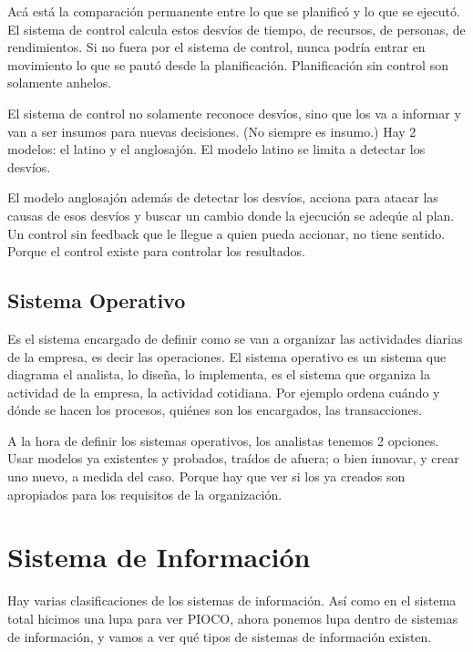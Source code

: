 Acá está la comparación permanente entre lo que se planificó y lo que se
ejecutó. El sistema de control calcula estos desvíos de tiempo, de
recursos, de personas, de rendimientos. Si no fuera por el sistema de
control, nunca podría entrar en movimiento lo que se pautó desde la
planificación. Planificación sin control son solamente anhelos.

El sistema de control no solamente reconoce desvíos, sino que los va a
informar y van a ser insumos para nuevas decisiones. (No siempre es
insumo.) Hay 2 modelos: el latino y el anglosajón. El modelo latino se
limita a detectar los desvíos.

El modelo anglosajón además de detectar los desvíos, acciona para atacar
las causas de esos desvíos y buscar un cambio donde la ejecución se
adeqúe al plan. Un control sin feedback que le llegue a quien pueda
accionar, no tiene sentido. Porque el control existe para controlar los
resultados.

\hypertarget{sistema-operativo}{%
\subsection{Sistema Operativo}\label{sistema-operativo}}

Es el sistema encargado de definir como se van a organizar las
actividades diarias de la empresa, es decir las operaciones. El sistema
operativo es un sistema que diagrama el analista, lo diseña, lo
implementa, es el sistema que organiza la actividad de la empresa, la
actividad cotidiana. Por ejemplo ordena cuándo y dónde se hacen los
procesos, quiénes son los encargados, las transacciones.

A la hora de definir los sistemas operativos, los analistas tenemos 2
opciones. Usar modelos ya existentes y probados, traídos de afuera; o
bien innovar, y crear uno nuevo, a medida del caso. Porque hay que ver
si los ya creados son apropiados para los requisitos de la organización.

\hypertarget{sistema-de-informaciuxf3n}{%
\section{Sistema de Información}\label{sistema-de-informaciuxf3n}}

Hay varias clasificaciones de los sistemas de información. Así como en
el sistema total hicimos una lupa para ver PIOCO, ahora ponemos lupa
dentro de sistemas de información, y vamos a ver qué tipos de sistemas
de información existen.


